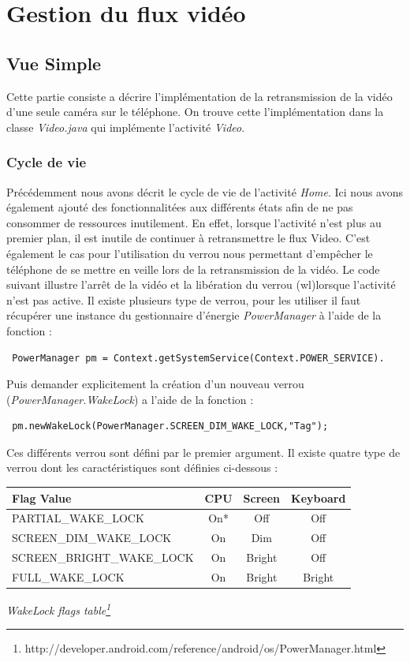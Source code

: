 \section{Gestion du flux vidéo}
\subsection{Vue Simple}
Cette partie consiste a décrire l'implémentation de la retransmission de la
vidéo d'une seule caméra sur le téléphone. On trouve cette l'implémentation dans la classe
\textit{Video.java} qui implémente l'activité \textit{Video}.
\subsubsection{Cycle de vie}
Précédemment nous avons décrit le cycle de vie de l'activité \textit{Home}.
Ici nous avons également ajouté des fonctionnalitées aux différents états afin de
ne pas consommer de ressources inutilement. En effet, lorsque l'activité n'est
plus au premier plan, il est inutile de continuer à retransmettre le flux
Video.\newline
C'est également le cas pour l'utilisation du verrou nous permettant d'empêcher
le téléphone de se mettre en veille lors de la retransmission de la vidéo. Le
code suivant illustre l'arrêt de la vidéo et la libération du verrou
(wl)lorsque l'activité n'est pas active.\newline
Il existe plusieurs type de verrou, pour les utiliser il faut récupérer une
instance du gestionnaire d'énergie \textit{PowerManager} à l'aide de la
fonction : 
\begin{lstlisting}
 PowerManager pm = Context.getSystemService(Context.POWER_SERVICE).
\end{lstlisting}
Puis demander explicitement la création d'un nouveau verrou
(\textit{PowerManager.WakeLock}) a l'aide de la fonction :
\begin{lstlisting}
 pm.newWakeLock(PowerManager.SCREEN_DIM_WAKE_LOCK,"Tag");
\end{lstlisting}
Ces différents verrou sont défini par le premier argument. Il existe quatre
type de verrou dont les caractéristiques sont définies ci-dessous :\newline
\begin{center}
\begin{tabular}{|l|c|c|c|}
\hline
Flag Value & CPU & Screen & Keyboard \\
\hline
PARTIAL\_WAKE\_LOCK & On* & Off & Off \\
SCREEN\_DIM\_WAKE\_LOCK & On & Dim & Off \\ 
SCREEN\_BRIGHT\_WAKE\_LOCK & On & Bright & Off \\
FULL\_WAKE\_LOCK & On & Bright & Bright \\
\hline
\end{tabular}
\newline
\textit{WakeLock flags table\footnote{\label{wakeLockTable}
http://developer.android.com/reference/android/os/PowerManager.html}}
\newline
\end{center}
